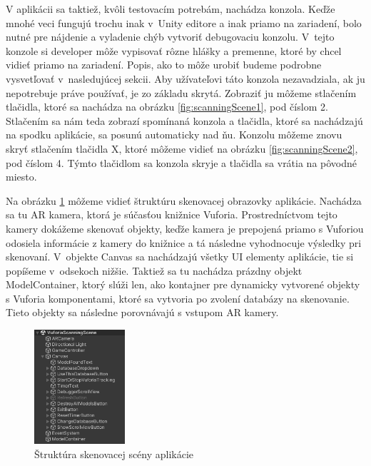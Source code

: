 V aplikácii sa taktiež, kvôli testovacím potrebám, nachádza konzola. Keďže mnohé veci fungujú trochu inak v~Unity editore a inak priamo na zariadení, bolo nutné pre nájdenie a vyladenie chýb vytvoriť debugovaciu konzolu. V~tejto konzole si developer môže vypisovať rôzne hlášky a premenne, ktoré by chcel vidieť priamo na zariadení. Popis, ako to môže urobiť budeme podrobne vysvetľovať v~nasledujúcej sekcii. Aby užívateľovi táto konzola nezavadziala, ak ju nepotrebuje práve používať, je zo základu skrytá. Zobraziť ju môžeme stlačením tlačidla, ktoré sa nachádza na obrázku \ref{fig:scanningScene1}, pod číslom 2. Stlačením sa nám teda zobrazí spomínaná konzola a tlačidla, ktoré sa nachádzajú na spodku aplikácie, sa posunú automaticky nad ňu. Konzolu môžeme znovu skryť stlačením tlačidla X, ktoré môžeme vidieť na obrázku \ref{fig:scanningScene2}, pod číslom 4. Týmto tlačidlom sa konzola skryje a tlačidla sa vrátia na pôvodné miesto.

\FloatBarrier 


Na obrázku \ref{fig:scanningSceneStructure} môžeme vidieť štruktúru skenovacej obrazovky aplikácie. Nachádza sa tu AR kamera, ktorá je súčasťou knižnice Vuforia. Prostredníctvom tejto kamery dokážeme skenovať objekty, keďže kamera je prepojená priamo s Vuforiou odosiela informácie z kamery do knižnice a tá následne vyhodnocuje výsledky pri skenovaní. V~objekte Canvas sa nachádzajú všetky UI elementy aplikácie, tie si popíšeme v~odsekoch nižšie. Taktiež sa tu nachádza prázdny objekt ModelContainer, ktorý slúži len, ako kontajner pre dynamicky vytvorené objekty s Vuforia komponentami, ktoré sa vytvoria po zvolení databázy na skenovanie. Tieto objekty sa následne porovnávajú s vstupom AR kamery.   

\begin{figure}[h]
  \centering
  \includegraphics[width=0.3\textwidth]{img/structure_scanning.png}
  \caption{Štruktúra skenovacej scény aplikácie}
  \label{fig:scanningSceneStructure}
\end{figure}

